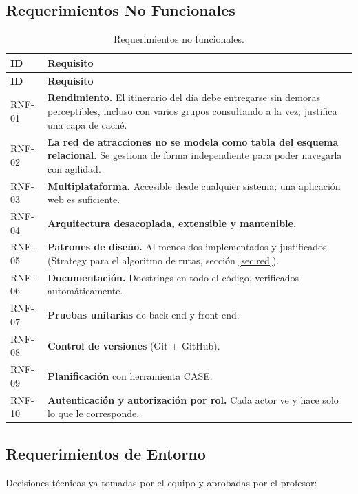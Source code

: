 \documentclass[11pt,a4paper]{article}
\begin{document}
\subsection{Requerimientos No Funcionales}
{\footnotesize\setlength{\tabcolsep}{3pt}\renewcommand{\arraystretch}{1.15}
\begin{longtable}{|>{\raggedright\arraybackslash}p{1.48cm}|>{\raggedright\arraybackslash}p{14.28cm}|}
\caption{Requerimientos no funcionales.}\label{tab:rnf}\\ \hline
\rowcolor{gray!20} \textbf{ID} & \textbf{Requisito} \\ \hline
\endfirsthead
\hline \rowcolor{gray!20} \textbf{ID} & \textbf{Requisito} \\ \hline
\endhead
RNF-01 & \textbf{Rendimiento.} El itinerario del día debe entregarse sin demoras perceptibles, incluso con varios grupos consultando a la vez; justifica una capa de caché. \\ \hline
RNF-02 & \textbf{La red de atracciones no se modela como tabla del esquema relacional.} Se gestiona de forma independiente para poder navegarla con agilidad. \\ \hline
RNF-03 & \textbf{Multiplataforma.} Accesible desde cualquier sistema; una aplicación web es suficiente. \\ \hline
RNF-04 & \textbf{Arquitectura desacoplada, extensible y mantenible.} \\ \hline
RNF-05 & \textbf{Patrones de diseño.} Al menos dos implementados y justificados (Strategy para el algoritmo de rutas, sección \ref{sec:red}). \\ \hline
RNF-06 & \textbf{Documentación.} Docstrings en todo el código, verificados automáticamente. \\ \hline
RNF-07 & \textbf{Pruebas unitarias} de back-end y front-end. \\ \hline
RNF-08 & \textbf{Control de versiones} (Git + GitHub). \\ \hline
RNF-09 & \textbf{Planificación} con herramienta CASE. \\ \hline
RNF-10 & \textbf{Autenticación y autorización por rol.} Cada actor ve y hace solo lo que le corresponde. \\ \hline
\end{longtable}}
\vspace{2pt}
\subsection{Requerimientos de Entorno}
Decisiones técnicas ya tomadas por el equipo y aprobadas por el profesor:
\end{document}
